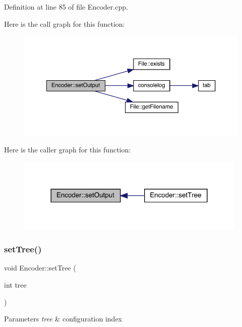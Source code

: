 Definition at line 85 of file Encoder.\+cpp.

Here is the call graph for this function\+:
\nopagebreak
\begin{figure}[H]
\begin{center}
\leavevmode
\includegraphics[width=350pt]{class_encoder_a81e43409dc83e9118472a81ba65e6779_cgraph}
\end{center}
\end{figure}
Here is the caller graph for this function\+:
\nopagebreak
\begin{figure}[H]
\begin{center}
\leavevmode
\includegraphics[width=312pt]{class_encoder_a81e43409dc83e9118472a81ba65e6779_icgraph}
\end{center}
\end{figure}
\mbox{\label{class_encoder_adc879a1000d99660b36d7369e00f4f06}} 
\subsubsection{\texorpdfstring{set\+Tree()}{setTree()}}
{\footnotesize\ttfamily void Encoder\+::set\+Tree (\begin{DoxyParamCaption}\item[{int}]{tree }\end{DoxyParamCaption})}


\begin{DoxyParams}{Parameters}
{\em tree} & configuration index \\
\hline
\end{DoxyParams}


